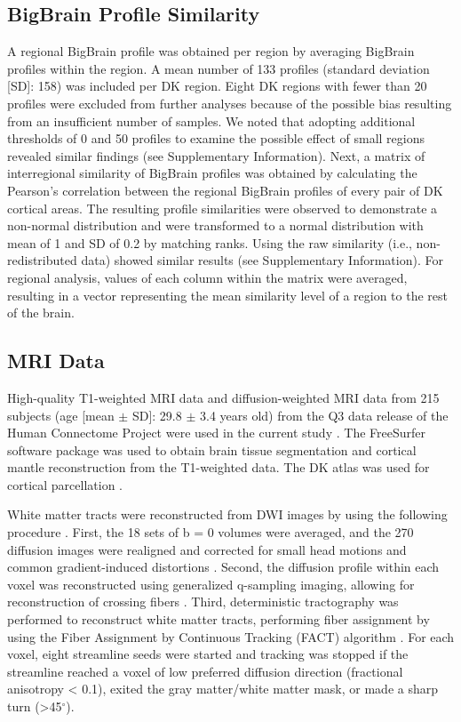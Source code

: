 \begin{refsection}
\subsection*{BigBrain Profile Similarity}
A regional BigBrain profile was obtained per region by averaging BigBrain profiles within the region. A mean number of 133 profiles (standard deviation [SD]: 158) was included per DK region. Eight DK regions with fewer than 20 profiles were excluded from further analyses because of the possible bias resulting from an insufficient number of samples. We noted that adopting additional thresholds of 0 and 50 profiles to examine the possible effect of small regions revealed similar findings (see Supplementary Information). Next, a matrix of interregional similarity of BigBrain profiles was obtained by calculating the Pearson's correlation between the regional BigBrain profiles of every pair of DK cortical areas. The resulting profile similarities were observed to demonstrate a non-normal distribution and were transformed to a normal distribution with mean of 1 and SD of 0.2 by matching ranks. Using the raw similarity (i.e., non-redistributed data) showed similar results (see Supplementary Information). For regional analysis, values of each column within the matrix were averaged, resulting in a vector representing the mean similarity level of a region to the rest of the brain.

\subsection*{MRI Data}
High-quality T1-weighted MRI data and diffusion-weighted MRI data from 215 subjects (age [mean $\pm$ SD]: 29.8 $\pm$ 3.4 years old) from the Q3 data release of the Human Connectome Project were used in the current study \citep{VANESSEN201362}. The FreeSurfer software package \citep{FISCHL2012Freesurfer} was used to obtain brain tissue segmentation and cortical mantle reconstruction from the T1-weighted data. The DK atlas was used for cortical parcellation \citep{DESIKAN2006968,Fischl2004parcellation}.

White matter tracts were reconstructed from DWI images by using the following procedure \citep{VANDENHEUVEL2016293}. First, the 18 sets of b = 0 volumes were averaged, and the 270 diffusion images were realigned and corrected for small head motions and common gradient-induced distortions \citep{ANDERSSON2002177}. Second, the diffusion profile within each voxel was reconstructed using generalized q-sampling imaging, allowing for reconstruction of crossing fibers \citep{YEH2010}. Third, deterministic tractography was performed to reconstruct white matter tracts, performing fiber assignment by using the Fiber Assignment by Continuous Tracking (FACT) algorithm \citep{MORI1999}. For each voxel, eight streamline seeds were started and tracking was stopped if the streamline reached a voxel of low preferred diffusion direction (fractional anisotropy < 0.1), exited the gray matter/white matter mask, or made a sharp turn (>45$^{\circ}$).


\end{refsection}
